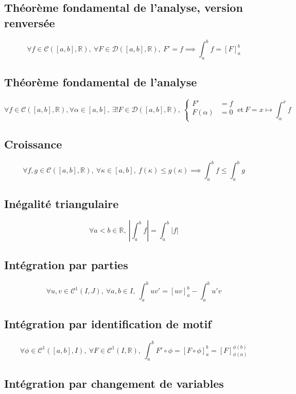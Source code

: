\documentclass{article}
\newcommand{\R}{{\mathbb R}}
\newcommand{\cC}{{\mathcal C}}
\newcommand{\cD}{{\mathcal D}}
\begin{document}
\subsection{Théorème fondamental de l'analyse, version renversée}

\[
	\forall f \in \cC([a, b], \R),\ \forall F \in \cD([a, b], \R),\ F' = f \implies
	\int_a^b f = [F]_a^b
\] 

\subsection{Théorème fondamental de l'analyse}

\[
	\forall f \in \cC([a, b], \R), \forall \alpha \in [a, b],\ 
	\exists! F \in \cD([a, b], \R),\ \begin{cases}
		F' &= f \\
		F(\alpha) &= 0 \\
	\end{cases}\ \text{et}\ F = x\mapsto \int_\alpha^x f
\] 

\subsection{Croissance}

\[
	\forall f, g \in \cC([a, b], \R),\ \forall \kappa \in [a, b],\ f(\kappa) \le g(\kappa) \implies \int_a^b f \le \int_a^b g
\] 

\subsection{Inégalité triangulaire}

\[
	\forall a<b \in \R,\ \left| \int_a^b f \right| = \int_a^b |f|
\] 

\subsection{Intégration par parties}

\[
	\forall u, v \in \cC^1(I, J),\ \forall a, b \in I,\ 
	\int_a^b uv' = [uv]_a^b - \int_a^b u'v
\] 

\subsection{Intégration par identification de motif}

\[
	\forall \phi \in \cC^1([a, b], I),\ \forall F \in \cC^1(I, \R),\ 
	\int_a^b F' \circ \phi = [F\circ \phi]_a^b = [F]_{\phi(a)}^{\phi(b)}
\] 
\subsection{Intégration par changement de variables}
\end{document}
